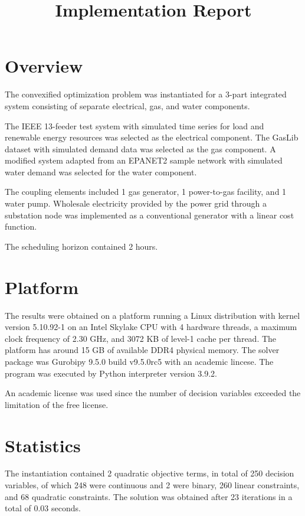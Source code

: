 \documentclass{article}
\title{Implementation Report}
\begin{document}
\maketitle




\section{Overview}
The convexified optimization problem was instantiated for a 3-part integrated
system consisting of separate electrical, gas, and water components.

The IEEE 13-feeder test system with simulated time series for load and renewable
energy resources was selected as the electrical component. The GasLib dataset
with simulated demand data was selected as the gas component. A modified system
adapted from an EPANET2 sample network with simulated water demand was selected
for the water component.

The coupling elements included 1 gas generator, 1 power-to-gas facility, and 1
water pump. Wholesale electricity provided by the power grid through a
substation node was implemented as a conventional generator with a linear cost
function.

The scheduling horizon contained 2 hours.




\section{Platform}
The results were obtained on a platform running a Linux distribution with kernel
version 5.10.92-1 on an Intel Skylake CPU with 4 hardware threads, a maximum
clock frequency of 2.30 GHz, and 3072 KB of level-1 cache per thread. The
platform has around 15 GB of available DDR4 physical memory. The solver package
was Gurobipy 9.5.0 build v9.5.0rc5 with an academic lincese. The program was
executed by Python interpreter version 3.9.2.

An academic license was used since the number of decision variables exceeded the
limitation of the free license.




\section{Statistics}
The instantiation contained 2 quadratic objective terms, in total of 250
decision variables, of which 248 were continuous and 2 were binary, 260 linear
constraints, and 68 quadratic constraints. The solution was obtained after 23
iterations in a total of 0.03 seconds.
\end{document}
